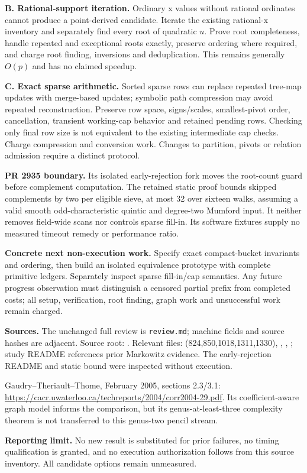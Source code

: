 \documentclass[11pt]{article}
\begin{document}
\textbf{B. Rational-support iteration.} Ordinary x values without rational ordinates cannot produce a point-derived candidate. Iterate the existing rational-x inventory and separately find every root of quadratic $u$. Prove root completeness, handle repeated and exceptional roots exactly, preserve ordering where required, and charge root finding, inversions and deduplication. This remains generally $O(p)$ and has no claimed speedup.

\textbf{C. Exact sparse arithmetic.} Sorted sparse rows can replace repeated tree-map updates with merge-based updates; symbolic path compression may avoid repeated reconstruction. Preserve row space, signs/scales, smallest-pivot order, cancellation, transient working-cap behavior and retained pending rows. Checking only final row size is not equivalent to the existing intermediate cap checks. Charge compression and conversion work. Changes to partition, pivots or relation admission require a distinct protocol.

\textbf{PR 2935 boundary.} Its isolated early-rejection fork moves the root-count guard before complement computation. The retained static proof bounds skipped complements by two per eligible sieve, at most 32 over sixteen walks, assuming a valid smooth odd-characteristic quintic and degree-two Mumford input. It neither removes field-wide scans nor controls sparse fill-in. Its software fixtures supply no measured timeout remedy or performance ratio.

\textbf{Concrete next non-execution work.} Specify exact compact-bucket invariants and ordering, then build an isolated equivalence prototype with complete primitive ledgers. Separately inspect sparse fill-in/cap semantics. Any future progress observation must distinguish a censored partial prefix from completed costs; all setup, verification, root finding, graph work and unsuccessful work remain charged.

\textbf{Sources.} The unchanged full review is \texttt{review.md}; machine fields and source hashes are adjacent. Source root: . Relevant files:  (824,850,1018,1311,1330), , , ; study README references prior Markowitz evidence. The early-rejection README and static bound were inspected without execution.

Gaudry--Theriault--Thome, February 2005, sections 2.3/3.1:
\url{https://cacr.uwaterloo.ca/techreports/2004/corr2004-29.pdf}.
Its coefficient-aware graph model informs the comparison, but its genus-at-least-three complexity theorem is not transferred to this genus-two pencil stream.

\textbf{Reporting limit.} No new result is substituted for prior failures, no timing qualification is granted, and no execution authorization follows from this source inventory. All candidate options remain unmeasured.
\end{document}
